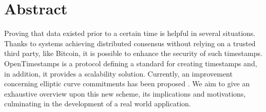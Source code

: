 \chapter{Abstract}
\label{chpr:abstract}

Proving that data existed prior to a certain time is helpful in several situations.
Thanks to systems achieving distributed consensus without relying on a trusted third party, like Bitcoin, it is possible to enhance the security of such timestamps.
OpenTimestamps is a protocol defining a standard for creating timestamps and, in addition, it provides a scalability solution.
Currently, an improvement concerning elliptic curve commitments has been proposed \cite{PoePR}. 
We aim to give an exhaustive overview upon this new scheme, its implications and motivations, culminating in the development of a real world application.

